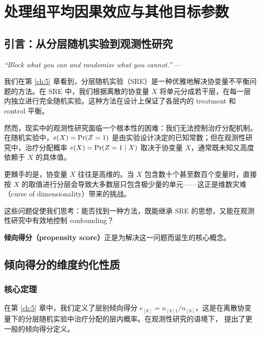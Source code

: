 
\chapter{处理组平均因果效应与其他目标参数}\label{ch:13}

\section{引言：从分层随机实验到观测性研究}\label{sec:13-intro}

\textit{``Block what you can and randomize what you cannot.''}
--- \citep[page 103]{BoxHunterHunter:1978}

我们在第 \ref{ch:5} 章看到，分层随机实验（SRE）是一种优雅地解决协变量不平衡问题的方法。在 SRE 中，我们根据离散的协变量 $X$ 将单元分成若干层，在每一层内独立进行完全随机实验。这种方法在设计上保证了各层内的 treatment 和 control 平衡。

然而，现实中的观测性研究面临一个根本性的困难：我们无法控制治疗分配机制。在随机实验中，$e(X) = \operatorname{Pr}(Z=1)$ 是由实验设计决定的已知常数；但在观测性研究中，治疗分配概率 $e(X) = \operatorname{Pr}(Z=1 \mid X)$ 取决于协变量 $X$，通常既未知又高度依赖于 $X$ 的具体值。

更棘手的是，协变量 $X$ 往往是高维的。当 $X$ 包含数十个甚至数百个变量时，直接按 $X$ 的取值进行分层会导致大多数层只包含极少量的单元——这正是维数灾难（curse of dimensionality）带来的挑战。

这些问题促使我们思考：能否找到一种方法，既能继承 SRE 的思想，又能在观测性研究中有效地控制 confounding？

\textbf{倾向得分（propensity score）}正是为解决这一问题而诞生的核心概念。

\section{倾向得分的维度约化性质}\label{sec:13-dimension-reduction}

\subsection{核心定理}\label{sec:13-theorem}

在第 \ref{ch:5} 章中，我们定义了层别倾向得分 $e_{[k]} = n_{[k]1}/n_{[k]}$，这是在离散协变量下的分层随机实验中治疗分配的层内概率。在观测性研究的语境下，\citet{RosenbaumRubin:1983} 提出了更一般的倾向得分定义。

